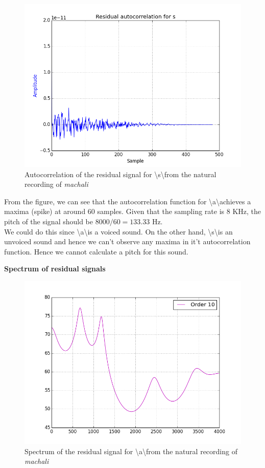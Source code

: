 \documentclass[a4paper]{article}
\begin{document}
\begin{figure}[h!]
    \includegraphics[width=\linewidth]{./images/res_autocorr_s.png}
    \caption{Autocorrelation of the residual signal for \textbackslash s\textbackslash from the natural recording of \textit{machali}}
    \label{fig:1}
\end{figure}

From the figure, we can see that the autocorrelation function for \textbackslash a\textbackslash achieves a maxima (spike) at around 60 samples. Given that the sampling rate is $8$ KHz, the pitch of the signal should be $8000/60 = 133.33$ Hz. \\
We could do this since \textbackslash a\textbackslash is a voiced sound. On the other hand, \textbackslash s\textbackslash is an unvoiced sound and hence we can't observe any maxima in it't autocorrelation function. Hence we cannot calculate a pitch for this sound. 

\textbf{Spectrum of residual signals}

\begin{figure}[h!]
    \includegraphics[width=\linewidth]{./images/res_spec_a.png}
    \caption{Spectrum of the residual signal for  \textbackslash a\textbackslash from the natural recording of \textit{machali}}
    \label{fig:1}
\end{figure}
\end{document}
